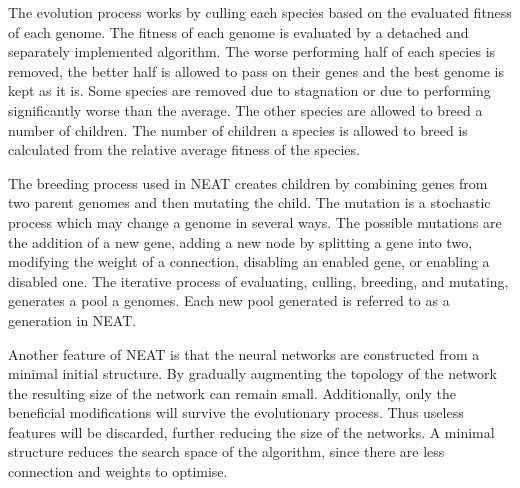 The evolution process works by culling each species based on the evaluated fitness of each genome. The fitness of each genome is evaluated by a detached and separately implemented algorithm. The worse performing half of each species is removed, the better half is allowed to pass on their genes and the best genome is kept as it is. Some species are removed due to stagnation or due to performing significantly worse than the average. The other species are allowed to breed a number of children. The number of children a species is allowed to breed is calculated from the relative average fitness of the species. 

The breeding process used in NEAT creates children by combining genes from two parent genomes and then mutating the child. The mutation is a stochastic process which may change a genome in several ways. The possible mutations are the addition of a new gene, adding a new node by splitting a gene into two, modifying the weight of a connection, disabling an enabled gene, or enabling a disabled one. The iterative process of evaluating, culling, breeding, and mutating, generates a pool a genomes. Each new pool generated is referred to as a generation in NEAT.

Another feature of NEAT is that the neural networks are constructed from a minimal initial structure. By gradually augmenting the topology of the network the resulting size of the network can remain small. Additionally, only the beneficial modifications will survive the evolutionary process. Thus useless features will be discarded, further reducing the size of the networks. A minimal structure reduces the search space of the algorithm, since there are less connection and weights to optimise. 
